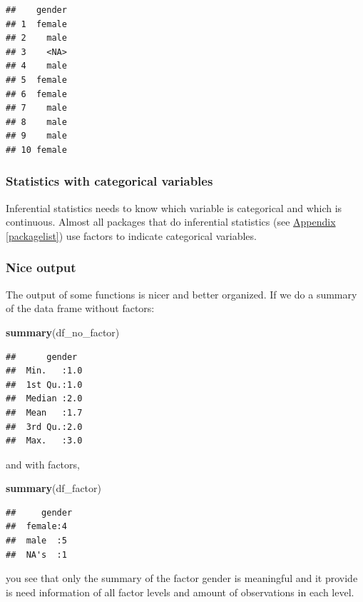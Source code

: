 \documentclass[
]{scrartcl}
\newenvironment{Shaded}{\begin{snugshade}}{\end{snugshade}}
\newcommand{\FunctionTok}[1]{\textcolor[rgb]{0.13,0.29,0.53}{\textbf{#1}}}
\newcommand{\NormalTok}[1]{#1}
\begin{document}
\begin{verbatim}
##    gender
## 1  female
## 2    male
## 3    <NA>
## 4    male
## 5  female
## 6  female
## 7    male
## 8    male
## 9    male
## 10 female
\end{verbatim}

\subsubsection{Statistics with categorical variables}\label{statistics-with-categorical-variables}

Inferential statistics needs to know which variable is categorical and which is continuous. Almost all packages that do inferential statistics (see \hyperref[packagelist]{Appendix} \ref{packagelist}) use factors to indicate categorical variables.

\subsubsection{Nice output}\label{nice-output}

The output of some functions is nicer and better organized. If we do a summary of the data frame without factors:

\begin{Shaded}
\begin{Highlighting}[]
\FunctionTok{summary}\NormalTok{(df\_no\_factor)}
\end{Highlighting}
\end{Shaded}

\begin{verbatim}
##      gender   
##  Min.   :1.0  
##  1st Qu.:1.0  
##  Median :2.0  
##  Mean   :1.7  
##  3rd Qu.:2.0  
##  Max.   :3.0
\end{verbatim}

and with factors,

\begin{Shaded}
\begin{Highlighting}[]
\FunctionTok{summary}\NormalTok{(df\_factor)}
\end{Highlighting}
\end{Shaded}

\begin{verbatim}
##     gender 
##  female:4  
##  male  :5  
##  NA's  :1
\end{verbatim}

you see that only the summary of the factor gender is meaningful and it provide is need information of all factor levels and amount of observations in each level.
\end{document}
